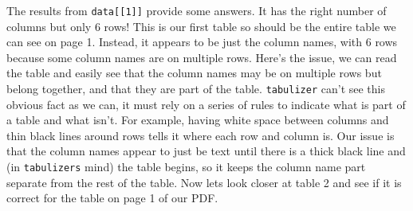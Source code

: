 \documentclass[
  12pt,
]{book}
\begin{document}
The results from \texttt{data{[}{[}1{]}{]}} provide some answers. It has the right number of columns but only 6 rows! This is our first table so should be the entire table we can see on page 1. Instead, it appears to be just the column names, with 6 rows because some column names are on multiple rows. Here's the issue, we can read the table and easily see that the column names may be on multiple rows but belong together, and that they are part of the table. \texttt{tabulizer} can't see this obvious fact as we can, it must rely on a series of rules to indicate what is part of a table and what isn't. For example, having white space between columns and thin black lines around rows tells it where each row and column is. Our issue is that the column names appear to just be text until there is a thick black line and (in \texttt{tabulizer\textquotesingle{}s} mind) the table begins, so it keeps the column name part separate from the rest of the table. Now lets look closer at table 2 and see if it is correct for the table on page 1 of our PDF.
\end{document}
